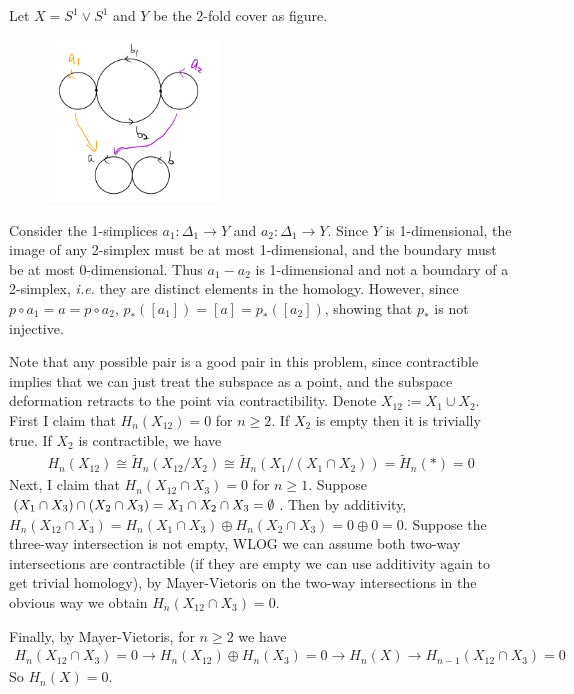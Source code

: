 \documentclass[12pt]{article}
\begin{document}
\begin{problem}[2]
Let $ X = S^{1} \vee S^{1}$ and $ Y$ be the 2-fold cover as figure.
 ~\begin{figure}[H]
	\centering
	\includegraphics[width=0.4\textwidth]{./figures/2-cover-8.png}
	\caption{}
\end{figure}
Consider the 1-simplices $ a_1: \Delta_1 \to Y$ and $ a_2: \Delta_1 \to Y$. Since $ Y$ is 1-dimensional, the image of any 2-simplex must be at most 1-dimensional, and the boundary must be at most 0-dimensional. Thus $ a_1 - a_2$ is 1-dimensional and not a boundary of a 2-simplex, \emph{i.e.} they are distinct elements in the homology. However, since $ p \circ a_1 = a = p \circ a_2$, $ p_*([ a_1]) = [ a] = p_*([ a_2])$, showing that $ p_*$ is not injective.
\end{problem}
\begin{problem}[4]
Note that any possible pair is a good pair in this problem, since contractible implies that we can just treat the subspace as a point, and the subspace deformation retracts to the point via contractibility. Denote $ X_{12} := X_1 \cup X_2$. First I claim that $ H_n(X_{12}) = 0$ for $ n\geq 2$. If  $ X_2$ is empty then it is trivially true. If $ X_2$ is contractible, we have
\begin{align*}
	H_n(X_{12}) \cong \widetilde{ H}_n(X_{12}/X_2) \cong \widetilde{ H}_n(X_1 / (X_1 \cap X_2)) = \widetilde{ H}_n(*) = 0
\end{align*}
Next, I claim that $ H_n(X_{12} \cap X_3) = 0$ for $ n \geq 1$. Suppose $ (X_1 \cap X_3) \cap (X_2 \cap X_3) = X_1 \cap X_2 \cap X_3 = \emptyset $. Then by additivity, $ H_n(X_{12} \cap X_3) = H_n(X_1 \cap X_3) \oplus  H_n(X_2 \cap X_3) = 0 \oplus 0 = 0$. Suppose the three-way intersection is not empty, WLOG we can assume both two-way intersections are contractible (if they are empty we can use additivity again to get trivial homology), by Mayer-Vietoris on the two-way intersections in the obvious way we obtain $ H_n(X_{12} \cap X_3) = 0 $.

Finally, by Mayer-Vietoris, for $ n \geq 2$ we have
\begin{align*}
	H_n(X_{12} \cap X_3)=0 \to H_n(X_{12}) \oplus H_n(X_3) = 0 \to H_n(X) \to H_{n-1}(X_{12} \cap X_3) = 0
\end{align*}
So $ H_n(X) =0$.
\end{problem}
\end{document}
